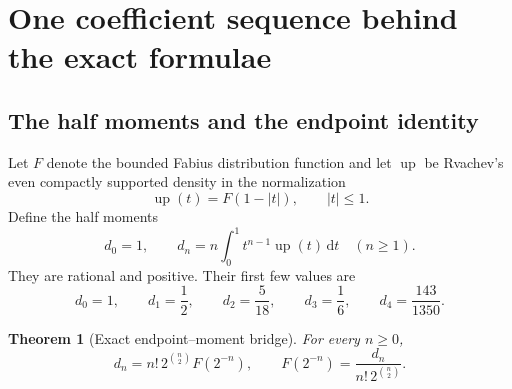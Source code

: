 \documentclass[11pt,oneside]{article}
\newtheorem{theorem}{Theorem}[section]
\theoremstyle{definition}
\theoremstyle{remark}
\newcommand{\Up}{\operatorname{up}}
\newcommand{\dd}{\,\mathrm d}
\begin{document}
\section{One coefficient sequence behind the exact formulae}
\label{dyadicasym:sec:exact-sequence}

\subsection{The half moments and the endpoint identity}

Let $F$ denote the bounded Fabius distribution function and let $\Up$ be Rvachev's even
compactly supported density in the normalization
\begin{equation}
 \Up(t)=F(1-|t|),\qquad |t|\le1.                             \label{dyadicasym:eq:up-fold}
\end{equation}
Define the half moments
\begin{equation}
 d_0=1,
 \qquad
 d_n=n\int_0^1t^{n-1}\Up(t)\dd t\quad(n\ge1).               \label{dyadicasym:eq:dn}
\end{equation}
They are rational and positive.  Their first few values are
\begin{equation}
 d_0=1,\qquad d_1=\frac12,\qquad d_2=\frac5{18},\qquad
 d_3=\frac16,\qquad d_4=\frac{143}{1350}.                  \label{dyadicasym:eq:dn-first}
\end{equation}

\begin{theorem}[Exact endpoint--moment bridge]
\label{dyadicasym:thm:endpoint-moment}
For every $n\ge0$,
\begin{equation}
 d_n=n!\,2^{\binom n2}F(2^{-n}),
 \qquad
 F(2^{-n})=\frac{d_n}{n!\,2^{\binom n2}}.                  \label{dyadicasym:eq:endpoint-moment}
\end{equation}
\end{theorem}
\end{document}
